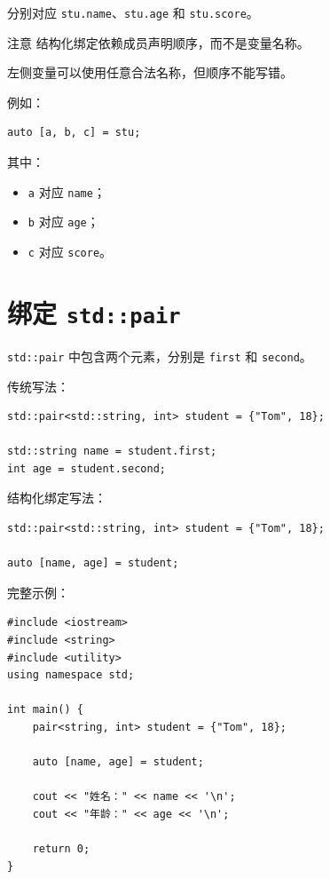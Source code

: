 \documentclass[UTF8,12pt,a4paper]{ctexart}
\begin{document}
分别对应 \texttt{stu.name}、\texttt{stu.age} 和 \texttt{stu.score}。

\begin{warningbox}{注意}
结构化绑定依赖成员声明顺序，而不是变量名称。

左侧变量可以使用任意合法名称，但顺序不能写错。
\end{warningbox}

例如：

\begin{lstlisting}
auto [a, b, c] = stu;
\end{lstlisting}

其中：

\begin{itemize}
    \item \texttt{a} 对应 \texttt{name}；
    \item \texttt{b} 对应 \texttt{age}；
    \item \texttt{c} 对应 \texttt{score}。
\end{itemize}

\section{绑定 \texttt{std::pair}}

\texttt{std::pair} 中包含两个元素，分别是 \texttt{first} 和 \texttt{second}。

传统写法：

\begin{lstlisting}
std::pair<std::string, int> student = {"Tom", 18};

std::string name = student.first;
int age = student.second;
\end{lstlisting}

结构化绑定写法：

\begin{lstlisting}
std::pair<std::string, int> student = {"Tom", 18};

auto [name, age] = student;
\end{lstlisting}

完整示例：

\begin{lstlisting}
#include <iostream>
#include <string>
#include <utility>
using namespace std;

int main() {
    pair<string, int> student = {"Tom", 18};

    auto [name, age] = student;

    cout << "姓名：" << name << '\n';
    cout << "年龄：" << age << '\n';

    return 0;
}
\end{lstlisting}
\end{document}
